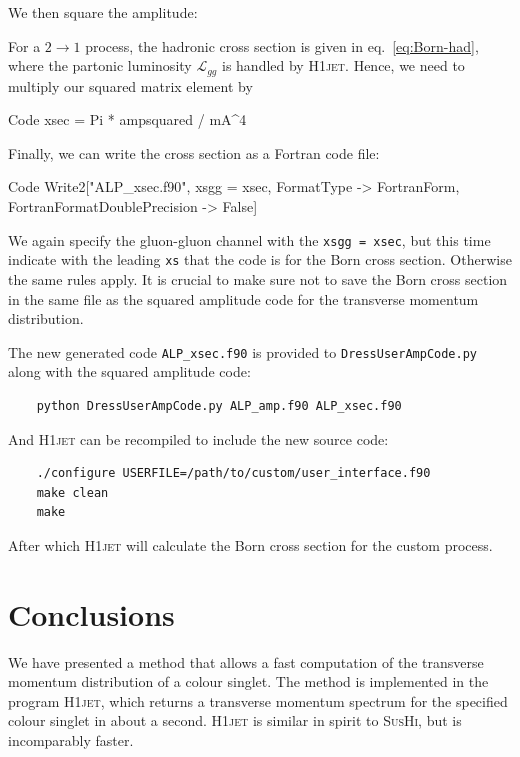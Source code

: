 \documentclass[12pt]{article}
\begin{document}
We then square the amplitude: 
For a $2 \rightarrow 1$ process, the hadronic cross section is given in eq.~\eqref{eq:Born-had}, where the partonic luminosity $\mathcal{L}_{gg}$ is handled by \textsc{H1jet}. Hence, we need to multiply our squared matrix element by
\begin{mmaCell}{Code}
xsec = Pi * ampsquared / mA^4 
\end{mmaCell}
Finally, we can write the cross section as a Fortran code file: 
\begin{mmaCell}{Code}
Write2["ALP_xsec.f90", xsgg = xsec, FormatType -> FortranForm, FortranFormatDoublePrecision -> False] 
\end{mmaCell}
We again specify the gluon-gluon channel with the \texttt{xsgg = xsec}, but this time indicate with the leading \texttt{xs} that the code is for the Born cross section. Otherwise the same rules apply. It is crucial to make sure not to save the Born cross section in the same file as the squared amplitude code for the transverse momentum distribution. 

The new generated code \texttt{ALP\_xsec.f90} is provided to \texttt{DressUserAmpCode.py} along with the squared amplitude code: 
\begin{lstlisting}
	python DressUserAmpCode.py ALP_amp.f90 ALP_xsec.f90 
\end{lstlisting}
And \textsc{H1jet} can be recompiled to include the new source code: 
\begin{lstlisting}
	./configure USERFILE=/path/to/custom/user_interface.f90 
	make clean
	make 
\end{lstlisting}
After which \textsc{H1jet} will calculate the Born cross section for the custom process. 

\section{Conclusions}
\label{sec:the-end}

We have presented a method that allows a fast computation of the
transverse momentum distribution of a colour singlet. The method is
implemented in the program \textsc{H1jet}, which returns a transverse momentum
spectrum for the specified colour singlet in about a second. \textsc{H1jet} is
similar in spirit to \textsc{SusHi}, but is incomparably faster.
\end{document}
